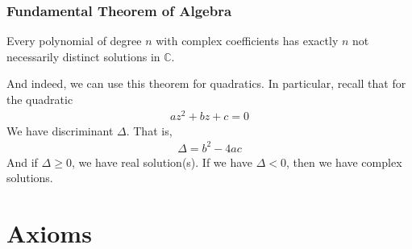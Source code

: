 \documentclass[a4paper]{article}
\theoremstyle{plain}
\newtheorem{thm}{Theorem}[section]
\theoremstyle{definition}
\theoremstyle{remark}
\begin{document}
\subsubsection{Fundamental Theorem of Algebra}
\begin{tcolorbox}[colback=black!3!white,colframe=black!60!white,title=\begin{thm}Fundamental Theorem of Algebra \label{Fundamental Theorem of Algebra}\end{thm}]
	Every polynomial of degree $n$ with complex coefficients has exactly $n$ not necessarily distinct solutions in $\mathbb{C}$.
\end{tcolorbox}
And indeed, we can use this theorem for quadratics. In particular, recall that for the quadratic
\begin{align*}
	az^2+bz+c=0
\end{align*}
We have discriminant $\Delta$. That is,
\begin{align*}
	\Delta = b^2-4ac
\end{align*}
And if $\Delta \ge 0$, we have real solution(s). If we have $\Delta < 0$, then we have complex solutions.
\section{Axioms}
\end{document}
